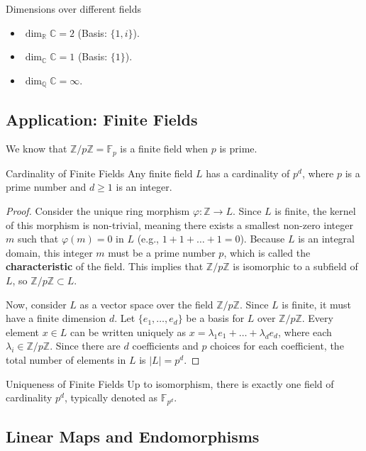 \documentclass[11pt, a4paper]{article}
\newcommand{\R}{\mathbb{R}}
\newcommand{\Z}{\mathbb{Z}}
\newcommand{\Q}{\mathbb{Q}}
\newcommand{\C}{\mathbb{C}}
\begin{document}
\begin{example}{Dimensions over different fields}{}
\begin{itemize}
    \item $\dim_\R \C = 2$ (Basis: $\{1, i\}$). 
    \item $\dim_\C \C = 1$ (Basis: $\{1\}$). 
    \item $\dim_\Q \C = \infty$. 
\end{itemize}
\end{example}

\subsection{Application: Finite Fields}

We know that $\Z/p\Z = \mathbb{F}_p$ is a finite field when $p$ is prime. 

\begin{theorem}{Cardinality of Finite Fields}{}
Any finite field $L$ has a cardinality of $p^d$, where $p$ is a prime number and $d \ge 1$ is an integer. 
\end{theorem}
\begin{proof}
Consider the unique ring morphism $\varphi: \Z \to L$. 
Since $L$ is finite, the kernel of this morphism is non-trivial, meaning there exists a smallest non-zero integer $m$ such that $\varphi(m) = 0$ in $L$ (e.g., $1 + 1 + \dots + 1 = 0$). 
Because $L$ is an integral domain, this integer $m$ must be a prime number $p$, which is called the \textbf{characteristic} of the field. 
This implies that $\Z/p\Z$ is isomorphic to a subfield of $L$, so $\Z/p\Z \subset L$. 

Now, consider $L$ as a vector space over the field $\Z/p\Z$. 
Since $L$ is finite, it must have a finite dimension $d$. Let $\{e_1, \dots, e_d\}$ be a basis for $L$ over $\Z/p\Z$. 
Every element $x \in L$ can be written uniquely as $x = \lambda_1 e_1 + \dots + \lambda_d e_d$, where each $\lambda_i \in \Z/p\Z$. 
Since there are $d$ coefficients and $p$ choices for each coefficient, the total number of elements in $L$ is $|L| = p^d$. 
\end{proof}

\begin{remark}{Uniqueness of Finite Fields}{}
Up to isomorphism, there is exactly one field of cardinality $p^d$, typically denoted as $\mathbb{F}_{p^d}$. 
\end{remark}

\subsection{Linear Maps and Endomorphisms}
\end{document}
